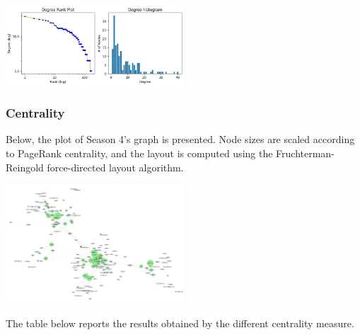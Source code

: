 \documentclass[10pt,twocolumn,letterpaper]{article}
\begin{document}
\begin{center}
    \includegraphics[width=0.5\textwidth]{img/s4/degree_plot.jpg}
\end{center}


\subsubsection{Centrality}

Below, the plot of Season 4's graph is presented. Node sizes are scaled according to PageRank centrality, and the layout is computed using the Fruchterman-Reingold force-directed layout algorithm.


\begin{center}
    \includegraphics[width=0.5\textwidth]{img/s4/pagerank_graph.jpg}
\end{center}


The table below reports the results obtained by the different centrality measure.
\end{document}
